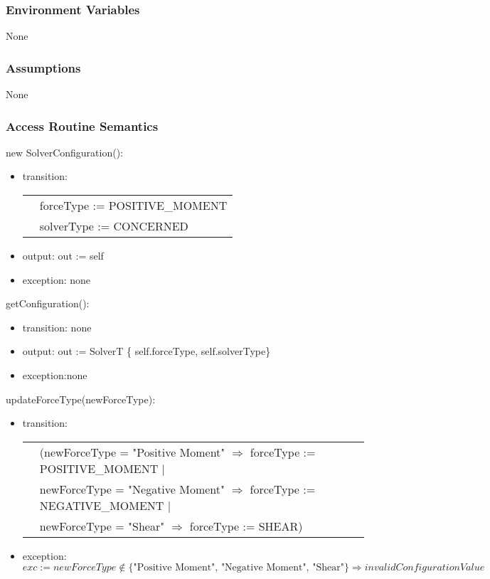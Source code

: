 \documentclass[12pt, titlepage]{article}
\begin{document}
\subsubsection{Environment Variables}
None
\subsubsection{Assumptions}
None
\subsubsection{Access Routine Semantics}

\noindent new SolverConfiguration():
\begin{itemize}
\item transition:\\
        \begin{tabular}{p{1cm} p{8cm}}
        & forceType := POSITIVE\_MOMENT\\
	& solverType := CONCERNED
        \end{tabular}
\item output: out := self
\item exception: none
\end{itemize}

\noindent getConfiguration():
\begin{itemize}
\item transition: none
\item output: out := SolverT \{ self.forceType, self.solverType\}
\item exception:none
\end{itemize}

\noindent updateForceType(newForceType):
\begin{itemize}
\item transition: \\
\begin{tabular}{p{1cm}p{16cm}}
& (newForceType = "Positive Moment" $\Rightarrow$ forceType := POSITIVE\_MOMENT $|$ \\
& newForceType = "Negative Moment" $\Rightarrow$ forceType := NEGATIVE\_MOMENT $|$\\
& newForceType = "Shear" $\Rightarrow$ forceType := SHEAR)\\
\end{tabular}
\item exception: $exc := newForceType \notin \{\text{"Positive Moment", "Negative Moment", "Shear"}\} \Rightarrow invalidConfigurationValue$
\end{itemize}
\end{document}
